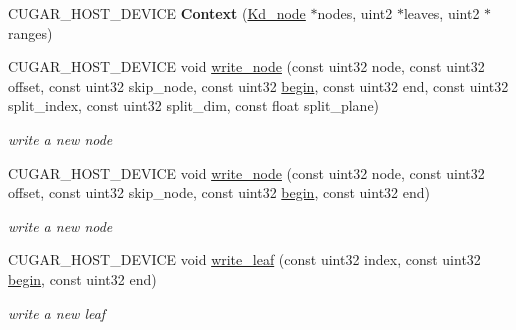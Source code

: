 \begin{DoxyCompactItemize}
\item 
\mbox{\label{structcugar_1_1cuda_1_1_kd__context_1_1_context_aee1e8f81d04c41d3cc6f2f33ef16dc02}} 
C\+U\+G\+A\+R\+\_\+\+H\+O\+S\+T\+\_\+\+D\+E\+V\+I\+CE {\bfseries Context} (\hyperlink{structcugar_1_1_kd__node}{Kd\+\_\+node} $\ast$nodes, uint2 $\ast$leaves, uint2 $\ast$ranges)
\item 
\mbox{\label{structcugar_1_1cuda_1_1_kd__context_1_1_context_af334cf590f3a2438f3bf332c131ee6f8}} 
C\+U\+G\+A\+R\+\_\+\+H\+O\+S\+T\+\_\+\+D\+E\+V\+I\+CE void \hyperlink{structcugar_1_1cuda_1_1_kd__context_1_1_context_af334cf590f3a2438f3bf332c131ee6f8}{write\+\_\+node} (const uint32 node, const uint32 offset, const uint32 skip\+\_\+node, const uint32 \hyperlink{namespacecugar_a2121df08f967e232ea5fe0ee378dee67}{begin}, const uint32 end, const uint32 split\+\_\+index, const uint32 split\+\_\+dim, const float split\+\_\+plane)
\begin{DoxyCompactList}\small\item\em write a new node \end{DoxyCompactList}\item 
\mbox{\label{structcugar_1_1cuda_1_1_kd__context_1_1_context_ab0ee0b93db5dff207418fe94ecbb5f68}} 
C\+U\+G\+A\+R\+\_\+\+H\+O\+S\+T\+\_\+\+D\+E\+V\+I\+CE void \hyperlink{structcugar_1_1cuda_1_1_kd__context_1_1_context_ab0ee0b93db5dff207418fe94ecbb5f68}{write\+\_\+node} (const uint32 node, const uint32 offset, const uint32 skip\+\_\+node, const uint32 \hyperlink{namespacecugar_a2121df08f967e232ea5fe0ee378dee67}{begin}, const uint32 end)
\begin{DoxyCompactList}\small\item\em write a new node \end{DoxyCompactList}\item 
\mbox{\label{structcugar_1_1cuda_1_1_kd__context_1_1_context_aee926e3f601065f962ee58b9cc6712ea}} 
C\+U\+G\+A\+R\+\_\+\+H\+O\+S\+T\+\_\+\+D\+E\+V\+I\+CE void \hyperlink{structcugar_1_1cuda_1_1_kd__context_1_1_context_aee926e3f601065f962ee58b9cc6712ea}{write\+\_\+leaf} (const uint32 index, const uint32 \hyperlink{namespacecugar_a2121df08f967e232ea5fe0ee378dee67}{begin}, const uint32 end)
\begin{DoxyCompactList}\small\item\em write a new leaf \end{DoxyCompactList}\end{DoxyCompactItemize}
